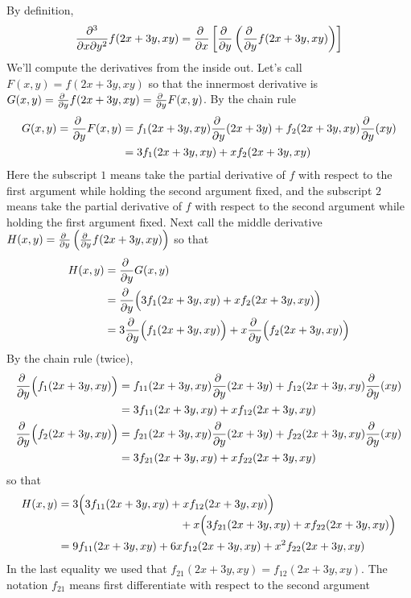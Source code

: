 \begin{solution}
By definition,
\begin{equation*}
\frac{\partial^3}{\partial x\partial y^2}f(2x+3y,xy)
=\pdiff{}{x}\left[\pdiff{}{y}\left(\pdiff{}{y}f(2x+3y,xy)\right)
\right]
\end{equation*}
We'll compute the derivatives from the inside out.
Let's call $F(x,y)=f(2x+3y,xy)$ so that the innermost derivative is $G(x,y)=\pdiff{}{y}f(2x+3y,xy)=\pdiff{}{y}F(x,y)$. By the chain rule
\begin{align*}
G(x,y)=\pdiff{}{y}F(x,y)
      &=f_1(2x+3y,xy)\pdiff{}{y}(2x+3y)+f_2(2x+3y,xy)\pdiff{}{y}(xy) \\
      &= 3f_1(2x+3y,xy)+xf_2(2x+3y,xy)
\end{align*}
Here the subscript $1$ means take the partial derivative of $f$ with respect to
the first argument while holding the second argument fixed, and
 the subscript $2$ means take the partial derivative of $f$ with respect to
the second argument while holding the first argument fixed. 
Next call the middle derivative 
$H(x,y)=\pdiff{}{y}\left(\pdiff{}{y}f(2x+3y,xy)\right)$ so that
\begin{align*}
H(x,y) &= \pdiff{}{y} G(x,y) \\
       &=\pdiff{}{y}\Big(3f_1(2x+3y,xy)+xf_2(2x+3y,xy)\Big) \\
       &=3\pdiff{}{y}\Big(f_1(2x+3y,xy)\Big)
         +x\pdiff{}{y}\Big(f_2(2x+3y,xy)\Big)
\end{align*}
By the chain rule (twice),
\begin{align*}
\pdiff{}{y}\Big(f_1(2x+3y,xy)\Big)
      &=f_{11}(2x+3y,xy)\pdiff{}{y}(2x+3y)+f_{12}(2x+3y,xy)\pdiff{}{y}(xy) \\
      &= 3f_{11}(2x+3y,xy)+xf_{12}(2x+3y,xy) \\
\pdiff{}{y}\Big(f_2(2x+3y,xy)\Big)
      &=f_{21}(2x+3y,xy)\pdiff{}{y}(2x+3y)+f_{22}(2x+3y,xy)\pdiff{}{y}(xy) \\
      &= 3f_{21}(2x+3y,xy)+xf_{22}(2x+3y,xy) 
\end{align*}
so that
\begin{align*}
H(x,y)&=3\Big(3f_{11}(2x+3y,xy)+xf_{12}(2x+3y,xy) \Big) \\[-0.05in]
         &\hskip1.5in  +x\Big(3f_{21}(2x+3y,xy)+xf_{22}(2x+3y,xy)\Big) \\
      &=9f_{11}(2x+3y,xy)+6xf_{12}(2x+3y,xy)+x^2f_{22}(2x+3y,xy)
\end{align*}
In the last equality we used that $f_{21}(2x+3y,xy)=f_{12}(2x+3y,xy)$.
The notation
$f_{21}$ means first differentiate with respect to the second argument

\end{solution}
